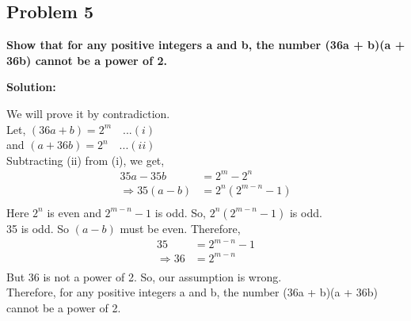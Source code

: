 \subsection{Problem 5}
\textbf{Show that for any positive integers a and b, the number (36a + b)(a + 36b) cannot be a power of 2.}
\par

\begin{flushleft}
\textbf{Solution: }
\par
We will prove it by contradiction.\\
Let, $ (36a+b) = 2^m \quad . . .(i) $ \\and $ (a+36b) = 2^n \quad . . .(ii) $ \\
Subtracting (ii) from (i), we get, \\
$$
\begin{aligned}
    35a - 35b & = 2^m - 2^n \\
    \Rightarrow 35(a-b) & = 2^n(2^{m-n} - 1) \\
\end{aligned}
$$
Here $ 2^n $ is even and $ 2^{m-n} - 1 $ is odd. So, $ 2^n(2^{m-n} - 1) $ is odd.\\
35 is odd. So $ (a-b) $ must be even.
Therefore, 
$$
\begin{aligned}
    35 &= 2^{m-n} -1 \\
    \Rightarrow 36 &= 2^{m-n} \\
\end{aligned}
$$
But 36 is not a power of 2. So, our assumption is wrong.\\
Therefore, for any positive integers a and b, the number (36a + b)(a + 36b) cannot be a power of 2.
\end{flushleft}
